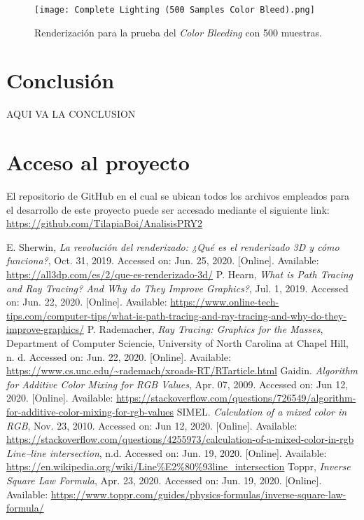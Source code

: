 \documentclass[conference]{IEEEtran}
\begin{document}
\begin{figure}[htbp]
\centerline{\texttt{[image: Complete Lighting (500 Samples Color Bleed).png]}}
\caption{Renderización para la prueba del \textit{Color Bleeding} con 500 muestras.}
\label{500 muestras color bleeding.}
\end{figure}

\section{Conclusión}

AQUI VA LA CONCLUSION

\section{Acceso al proyecto}
El repositorio de GitHub en el cual se ubican todos los archivos empleados para el desarrollo de este proyecto puede ser accesado mediante el siguiente link: \url{https://github.com/TilapiaBoi/AnalisisPRY2}

\begin{thebibliography}{00}
 E. Sherwin, \textit{La revolución del renderizado: ¿Qué es el renderizado 3D y cómo funciona?}, Oct. 31, 2019. Accessed on: Jun. 25, 2020. [Online].  Available: \url{https://all3dp.com/es/2/que-es-renderizado-3d/}
 P. Hearn, \textit{What is Path Tracing and Ray Tracing? And Why do They Improve Graphics?}, Jul. 1, 2019. Accessed on: Jun. 22, 2020. [Online]. Available: \url{https://www.online-tech-tips.com/computer-tips/what-is-path-tracing-and-ray-tracing-and-why-do-they-improve-graphics/}
 P. Rademacher, \textit{Ray Tracing: Graphics for the Masses}, Department of Computer Sciencie, University of North Carolina at Chapel Hill, n. d. Accessed on: Jun. 22, 2020. [Online]. Available: \url{https://www.cs.unc.edu/~rademach/xroads-RT/RTarticle.html}
 Gaidin. \textit{Algorithm for Additive Color Mixing for RGB Values}, Apr. 07, 2009. Accessed on: Jun 12, 2020. [Online]. Available: \url{https://stackoverflow.com/questions/726549/algorithm-for-additive-color-mixing-for-rgb-values}
 SIMEL. \textit{Calculation of a mixed color in RGB}, Nov. 23, 2010. Accessed on: Jun 12, 2020. [Online]. Available: \url{https://stackoverflow.com/questions/4255973/calculation-of-a-mixed-color-in-rgb}
 \textit{Line–line intersection}, n.d. Accessed on: Jun. 19, 2020. [Online]. Available: \url{https://en.wikipedia.org/wiki/Line\%E2\%80\%93line_intersection}
 Toppr, \textit{Inverse Square Law Formula}, Apr. 23, 2020. Accessed on: Jun. 19, 2020. [Online]. Available: \url{https://www.toppr.com/guides/physics-formulas/inverse-square-law-formula/}
\end{thebibliography}
\end{document}
